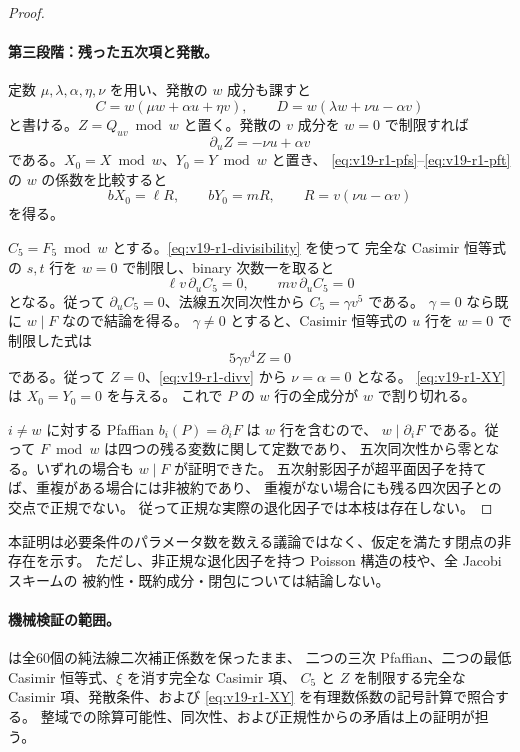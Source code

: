 \documentclass[11pt,a4paper]{ltjsarticle}
\theoremstyle{remark}\newtheorem{remark}[theorem]{注意}
\begin{document}
\begin{proof}
\paragraph{第三段階：残った五次項と発散。}
定数 $\mu,\lambda,\alpha,\eta,\nu$ を用い、発散の $w$ 成分も課すと
\[
 C=w(\mu w+\alpha u+\eta v),\qquad
 D=w(\lambda w+\nu u-\alpha v)
\]
と書ける。$Z=Q_{uv}\bmod w$ と置く。発散の $v$ 成分を $w=0$ で制限すれば
\begin{equation}\label{eq:v19-r1-divv}
                          \partial_u Z=-\nu u+\alpha v
\end{equation}
である。$X_0=X\bmod w$、$Y_0=Y\bmod w$ と置き、
\eqref{eq:v19-r1-pfs}--\eqref{eq:v19-r1-pft} の $w$ の係数を比較すると
\begin{equation}\label{eq:v19-r1-XY}
 bX_0=\ell R,\qquad bY_0=mR,
 \qquad R=v(\nu u-\alpha v)
\end{equation}
を得る。

$C_5=F_5\bmod w$ とする。\eqref{eq:v19-r1-divisibility} を使って
完全な Casimir 恒等式の $s,t$ 行を $w=0$ で制限し、binary 次数一を取ると
\[
                   \ell v\,\partial_u C_5=0,\qquad
                   mv\,\partial_u C_5=0
\]
となる。従って $\partial_uC_5=0$、法線五次同次性から $C_5=\gamma v^5$ である。
$\gamma=0$ なら既に $w\mid F$ なので結論を得る。
$\gamma\ne0$ とすると、Casimir 恒等式の $u$ 行を $w=0$ で制限した式は
\[
                             5\gamma v^4 Z=0
\]
である。従って $Z=0$、\eqref{eq:v19-r1-divv} から $\nu=\alpha=0$ となる。
\eqref{eq:v19-r1-XY} は $X_0=Y_0=0$ を与える。
これで $P$ の $w$ 行の全成分が $w$ で割り切れる。

$i\ne w$ に対する Pfaffian $b_i(P)=\partial_iF$ は $w$ 行を含むので、
$w\mid\partial_iF$ である。従って $F\bmod w$ は四つの残る変数に関して定数であり、
五次同次性から零となる。いずれの場合も $w\mid F$ が証明できた。
五次射影因子が超平面因子を持てば、重複がある場合には非被約であり、
重複がない場合にも残る四次因子との交点で正規でない。
従って正規な実際の退化因子では本枝は存在しない。
\end{proof}

本証明は必要条件のパラメータ数を数える議論ではなく、仮定を満たす閉点の非存在を示す。
ただし、非正規な退化因子を持つ Poisson 構造の枝や、全 Jacobi スキームの
被約性・既約成分・閉包については結論しない。

\paragraph{機械検証の範囲。}
 は全60個の純法線二次補正係数を保ったまま、
二つの三次 Pfaffian、二つの最低 Casimir 恒等式、$\xi$ を消す完全な Casimir 項、
$C_5$ と $Z$ を制限する完全な Casimir 項、発散条件、および
\eqref{eq:v19-r1-XY} を有理数係数の記号計算で照合する。
整域での除算可能性、同次性、および正規性からの矛盾は上の証明が担う。
\end{document}
